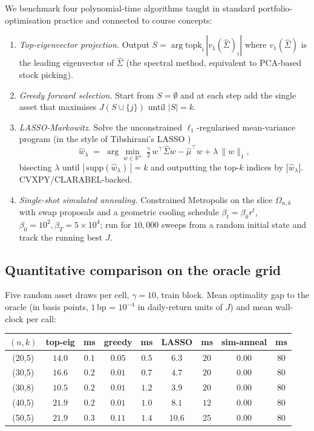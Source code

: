 We benchmark four polynomial-time algorithms taught in standard portfolio-optimisation
practice and connected to course concepts:
\begin{enumerate}\itemsep=2pt
  \item \emph{Top-eigenvector projection.} Output $S = \arg\mathrm{topk}_i\, |v_1(\hat\Sigma)_i|$
        where $v_1(\hat\Sigma)$ is the leading eigenvector of $\hat\Sigma$ (the spectral
        method, equivalent to PCA-based stock picking).
  \item \emph{Greedy forward selection.} Start from $S=\emptyset$ and at each step add the
        single asset that maximises $J(S\cup\{j\})$ until $|S|=k$.
  \item \emph{LASSO-Markowitz.} Solve the unconstrained $\ell_1$-regularised mean-variance
        program (in the style of Tibshirani's LASSO \cite{tibshirani-lasso})
        \[
          \hat w_\lambda \;=\; \arg\min_{w\in\mathbb R^n}\; \tfrac{\gamma}{2}\, w^\top\hat\Sigma w - \hat\mu^\top w
          + \lambda\,\|w\|_1,
        \]
        bisecting $\lambda$ until $|\,\mathrm{supp}(\hat w_\lambda)\,| = k$ and outputting
        the top-$k$ indices by $|\hat w_\lambda|$. CVXPY/CLARABEL-backed.
  \item \emph{Single-shot simulated annealing.} Constrained Metropolis on the slice
        $\Omega_{n,k}$ with swap proposals and a geometric cooling schedule
        $\beta_t = \beta_0 r^t$, $\beta_0=10^2,\beta_T=5\!\times\!10^4$; run for $10{,}000$
        sweeps from a random initial state and track the running best $J$.
\end{enumerate}

\subsection{Quantitative comparison on the oracle grid}\label{ssec:p2a-results}

Five random asset draws per cell, $\gamma=10$, train block. Mean optimality gap to the oracle
(in basis points, $1$\,bp = $10^{-4}$ in daily-return units of $J$) and mean wall-clock per call:

\begin{center}\small
\begin{tabular}{c|cc|cc|cc|cc}
$(n,k)$ & top-eig & ms & greedy & ms & LASSO & ms & sim-anneal & ms \\\hline
(20,5) & $14.0$ & $0.1$  & $0.05$ & $0.5$ & $6.3$ & $20$ & $\mathbf{0.00}$ & $80$ \\
(30,5) & $16.6$ & $0.2$  & $0.01$ & $0.7$ & $4.7$ & $20$ & $\mathbf{0.00}$ & $80$ \\
(30,8) & $10.5$ & $0.2$  & $0.01$ & $1.2$ & $3.9$ & $20$ & $\mathbf{0.00}$ & $80$ \\
(40,5) & $21.9$ & $0.2$  & $0.01$ & $1.0$ & $8.1$ & $12$ & $\mathbf{0.00}$ & $80$ \\
(50,5) & $21.9$ & $0.3$  & $0.11$ & $1.4$ & $10.6$ & $25$ & $\mathbf{0.00}$ & $80$ \\
\end{tabular}
\end{center}

